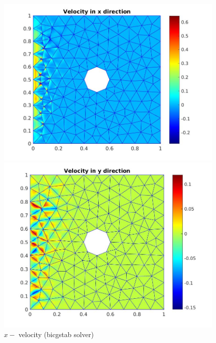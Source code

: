 \documentclass[a4paper]{book}
\begin{document}
\begin{figure}
  \begin{minipage}[c]{0.67\textwidth}
    \includegraphics[width=\textwidth]{cylinder_bicgstab_vx.jpg}
  \end{minipage}\hfill
  \begin{minipage}[c]{0.3\textwidth}
    \caption{$x-$ velocity (bicgstab solver)}
    \label{x_vel_stoke_bicgstab}
  \end{minipage}
  \begin{minipage}[c]{0.67\textwidth}
    \includegraphics[width=\textwidth]{cylinder_bicgstab_vy.jpg}
  \end{minipage}\hfill
  \begin{minipage}[c]{0.3\textwidth}

\end{minipage}
\end{figure}
\end{document}
